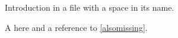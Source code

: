 Introduction in a file with a space in its name.

A \missingcommand{} here and a reference to \ref{alsomissing}.
